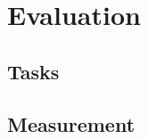 \section{Evaluation} \label{sec:evaluation}

\subsection{Tasks} \label{sec:tasks}

\subsection{Measurement} \label{sec:measurement}



\newpage